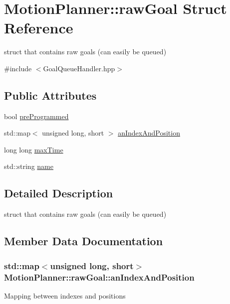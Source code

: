 \hypertarget{structMotionPlanner_1_1rawGoal}{}\section{Motion\+Planner\+:\+:raw\+Goal Struct Reference}
\label{structMotionPlanner_1_1rawGoal}


struct that contains raw goals (can easily be queued)  




{\ttfamily \#include $<$Goal\+Queue\+Handler.\+hpp$>$}

\subsection*{Public Attributes}
\begin{DoxyCompactItemize}
\item 
bool \hyperlink{structMotionPlanner_1_1rawGoal_ae2e017e05192a8bae95557f842cb731d}{pre\+Programmed}
\item 
std\+::map$<$ unsigned long, short $>$ \hyperlink{structMotionPlanner_1_1rawGoal_a37191a85a90ce62efb99d0f4f27b1dfd}{an\+Index\+And\+Position}
\item 
long long \hyperlink{structMotionPlanner_1_1rawGoal_afa955e47695e4a28c30c31dc64b5b8e5}{max\+Time}
\item 
std\+::string \hyperlink{structMotionPlanner_1_1rawGoal_af6298b64390d6d9d1c9047f7168d33fc}{name}
\end{DoxyCompactItemize}


\subsection{Detailed Description}
struct that contains raw goals (can easily be queued) 

\subsection{Member Data Documentation}
\subsubsection[{\texorpdfstring{an\+Index\+And\+Position}{anIndexAndPosition}}]{\setlength{\rightskip}{0pt plus 5cm}std\+::map$<$unsigned long, short$>$ Motion\+Planner\+::raw\+Goal\+::an\+Index\+And\+Position}\hypertarget{structMotionPlanner_1_1rawGoal_a37191a85a90ce62efb99d0f4f27b1dfd}{}\label{structMotionPlanner_1_1rawGoal_a37191a85a90ce62efb99d0f4f27b1dfd}
Mapping between indexes and positions 
